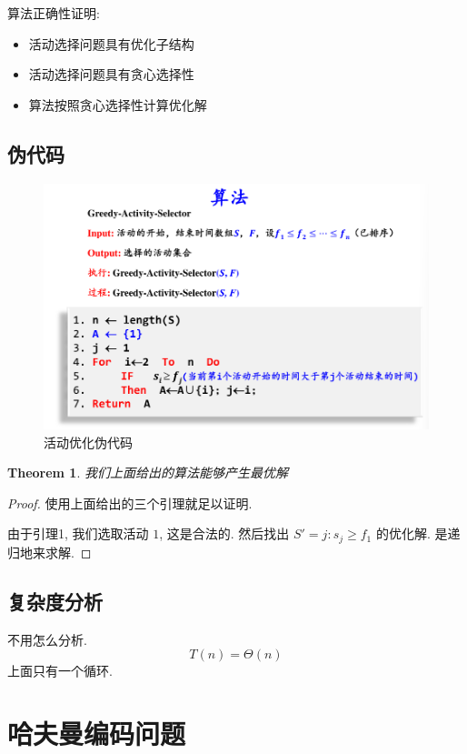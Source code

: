 \documentclass[a4paper, 10pt]{ctexart} %
\newtheorem{theorem}{Theorem}
\begin{document}
算法正确性证明: 
\begin{itemize}
    \item 活动选择问题具有优化子结构
    \item 活动选择问题具有贪心选择性
    \item 算法按照贪心选择性计算优化解
\end{itemize}

\subsection{伪代码}
\begin{figure}[H]
    \centering
    \includegraphics[scale =0.5]{6.png}
    \caption[]{活动优化伪代码}
\end{figure}
\begin{theorem}
    我们上面给出的算法能够产生最优解
\end{theorem}
\begin{proof}
    使用上面给出的三个引理就足以证明. 

    由于引理1, 我们选取活动 $1$, 这是合法的. 然后找出
    $S ' = {j: s _{j} \ge f_{1}}$ 的优化解. 是递归地来求解. 
\end{proof}
\subsection{复杂度分析}
不用怎么分析.
\[
T\left(n\right) =\Theta \left(n\right)
\]
上面只有一个循环. 

\section{哈夫曼编码问题}
\end{document}
